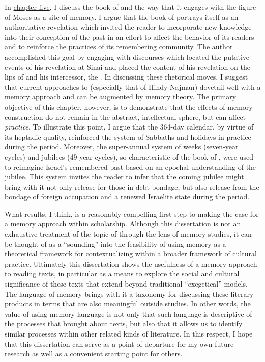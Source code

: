 In \hyperref[chap:jubilees]{chapter five}, I discuss the book of \jub and the way that it engages with the figure of Moses as a site of memory. I argue that the book of \jub portrays itself as an authoritative revelation which invited the reader to incorporate new knowledge into their conception of the past in an effort to affect the behavior of its readers and to reinforce the practices of its remembering community. The author accomplished this goal by engaging with \Psgraphical discourses which located the putative events of his revelation at Sinai and placed the content of his revelation on the lips of \yahweh and his intercessor, the \ap. In discussing these rhetorical moves, I suggest that current approaches to \jub (especially that of Hindy Najman) dovetail well with a memory approach and can be augmented by memory theory. The primary objective of this chapter, however, is to demonstrate that the effects of memory construction do not remain in the abstract, intellectual sphere, but can affect \emph{practice}. To illustrate this point, I argue that the 364-day calendar, by virtue of its heptadic quality, reinforced the system of Sabbaths and holidays in practice during the \secondtemple period. Moreover, the super-annual system of weeks (seven-year cycles) and jubilees (49-year cycles), so characteristic of the book of \jub, were used to reimagine Israel's remembered past based on an epochal understanding of the jubilee. This system invites the reader to infer that the coming jubilee might bring with it not only release for those in debt-bondage, but also release from the bondage of foreign occupation and a renewed Israelite state during the \secondtemple period.

What results, I think, is a reasonably compelling first step to making the case for a memory approach within \rwb scholarship. Although this dissertation is not an exhaustive treatment of the topic of \rwb through the lens of memory studies, it can be thought of as a ``sounding'' into the feasibility of using memory as a theoretical framework for contextualizing \rwb within a broader framework of cultural practice. Ultimately this dissertation shows the usefulness of a memory approach to reading \rwb texts, in particular as a means to explore the social and cultural significance of these texts that extend beyond traditional ``exegetical'' models. The language of memory  brings with it a taxonomy for discussing these literary products in terms that are also meaningful outside \secondtemple studies. In other words, the value of using memory language is not only that such language is descriptive of the processes that brought about \rwb texts, but also that it allows us to identify similar processes within other related kinds of literature. In this respect, I hope that this dissertation can serve as a point of departure for my own future research as well as a convenient starting point for others. 